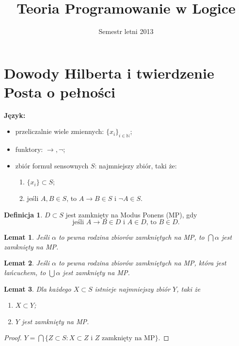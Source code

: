 \documentclass[10pt,a4paper]{article}
\title{Teoria Programowanie w Logice}
\author{}
\date{Semestr letni 2013}
\theoremstyle{plain}
\newtheorem{lemma}{Lemat}
\theoremstyle{definition}
\newtheorem*{definition}{Definicja}
\newcommand{\impl}{\rightarrow}
\newcommand{\N}{\mathbb{N}}
\newcommand{\header}[1]{\noindent\textbf{#1}}
\begin{document}
\maketitle

\section{Dowody Hilberta i twierdzenie Posta o pełności}

\header{Język:}

\begin{itemize}
  \item przeliczalnie wiele zmiennych: $\{x_i\}_{i\in\N}$;
  \item funktory: $\impl, \neg$;
  \item zbiór formuł sensownych $S$: najmniejszy zbiór, taki że:
  \begin{enumerate}
    \item $\{x_i\} \subset S$;
    \item jeśli $A, B \in S$, to $A \impl B \in S$ i $\neg A \in S$.
  \end{enumerate}
\end{itemize}

\begin{definition}
$D \subset S$ jest zamknięty na Modus Ponens (MP), gdy
$$\text{jeśli } A \impl B \in D \text{ i } A \in D \text{, to } B \in D.$$
\end{definition}

\begin{lemma}
Jeśli $\alpha$ to pewna rodzina zbiorów zamkniętych na MP,
to $\bigcap\alpha$ jest zamknięty na MP.
\end{lemma}

\begin{lemma}
Jeśli $\alpha$ to pewna rodzina zbiorów zamkniętych na MP, która jest łańcuchem,
to $\bigcup\alpha$ jest zamknięty na MP.
\end{lemma}

\begin{lemma}
Dla każdego $X \subset S$ istnieje najmniejszy zbiór $Y$, taki że
\begin{enumerate}
  \item $X \subset Y$;
  \item $Y$ jest zamknięty na MP.
\end{enumerate}
\end{lemma}

\begin{proof}
$Y = \bigcap \{
  Z \subset S : X \subset Z \text{ i } Z \text { zamknięty na MP}
\}.$
\end{proof}
\end{document}

